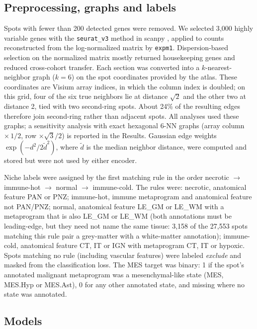 \documentclass[11pt,letterpaper]{article}
\begin{document}
\subsection{Preprocessing, graphs and labels}

Spots with fewer than 200 detected genes were removed. We selected 3{,}000 highly variable genes with the \texttt{seurat\_v3} method \cite{stuart2019} in scanpy \cite{wolf2018}, applied to counts reconstructed from the log-normalized matrix by \texttt{expm1}. Dispersion-based selection on the normalized matrix mostly returned housekeeping genes and reduced cross-cohort transfer. Each section was converted into a $k$-nearest-neighbor graph ($k = 6$) on the spot coordinates provided by the atlas. These coordinates are Visium array indices, in which the column index is doubled; on this grid, four of the six true neighbors lie at distance $\sqrt{2}$ and the other two at distance 2, tied with two second-ring spots. About 24\% of the resulting edges therefore join second-ring rather than adjacent spots. All analyses used these graphs; a sensitivity analysis with exact hexagonal 6-NN graphs (array column $\times\,1/2$, row $\times \sqrt{3}/2$) is reported in the Results. Gaussian edge weights $\exp(-d^2 / 2\tilde{d}^2)$, where $\tilde{d}$ is the median neighbor distance, were computed and stored but were not used by either encoder.

Niche labels were assigned by the first matching rule in the order necrotic $\rightarrow$ immune-hot $\rightarrow$ normal $\rightarrow$ immune-cold. The rules were: necrotic, anatomical feature PAN or PNZ; immune-hot, immune metaprogram and anatomical feature not PAN/PNZ; normal, anatomical feature LE\_GM or LE\_WM with a metaprogram that is also LE\_GM or LE\_WM (both annotations must be leading-edge, but they need not name the same tissue: 3{,}158 of the 27{,}553 spots matching this rule pair a grey-matter with a white-matter annotation); immune-cold, anatomical feature CT, IT or IGN with metaprogram CT, IT or hypoxic. Spots matching no rule (including vascular features) were labeled \emph{exclude} and masked from the classification loss. The MES target was binary: 1 if the spot's annotated malignant metaprogram was a mesenchymal-like state (MES, MES.Hyp or MES.Ast), 0 for any other annotated state, and missing where no state was annotated.

\subsection{Models}
\end{document}

